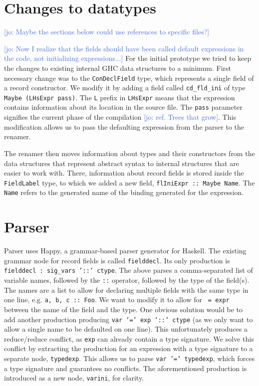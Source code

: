 \documentclass[en]{pracamgr}
\newcommand{\jcom}[1]{\textcolor{RoyalBlue}{[jo: #1]}}
\begin{document}
\section{Changes to datatypes} \jcom{Maybe the sections below could use references to specific files?}

\jcom{Now I realize that the fields should have been called default expressions in the code, not initializing expressions...}
For the initial prototype we tried to keep the changes to existing internal GHC data structures to a minimum.
First necessary change was to the \texttt{ConDeclField} type, which represents a single field of a record constructor.
We modify it by adding a field called \texttt{cd\_fld\_ini} of type \texttt{Maybe (LHsExpr pass)}. 
The \texttt{L} prefix in \texttt{LHsExpr} means that the expression contains information about its location in the source file.
The \texttt{pass} parameter signifies the current phase of the compilation \jcom{ref. Trees that grow}.
This modification allows us to pass the defaulting expression from the parser to the renamer.

The renamer then moves information about types and their constructors from the data structures that represent abstract syntax to internal structures that are easier to work with.
There, information about record fields is stored inside the \texttt{FieldLabel} type, to which we added a new field, \texttt{flIniExpr :: Maybe Name}.
The \texttt{Name} refers to the generated name of the binding generated for the expression.

\section{Parser}
Parser uses Happy, a grammar-based parser generator for Haskell.
The existing grammar node for record fields is called \texttt{fielddecl}.
Its only production is \texttt{fielddecl : sig\_vars '::' ctype}.
The above parses a comma-separated list of variable names, followed by the \texttt{::} operator, followed by the type of the field(s).
The names are a list to allow for declaring multiple fields with the same type in one line, e.g. \texttt{a, b, c :: Foo}.
We want to modify it to allow for \texttt{ = expr} between the name of the field and the type.
One obvious solution would be to add another production producing \texttt{var '=' exp '::' ctype} (as we only want to allow a single name to be defaulted on one line).
This unfortunately produces a reduce/reduce conflict, as \texttt{exp} can already contain a type signature. 
We solve this conflict by extracting the production for an expression with a type signature to a separate node, \texttt{typedexp}.
This allows us to parse \texttt{var '=' typedexp}, which forces a type signature and guarantees no conflicts.
The aforementioned production is introduced as a new node, \texttt{varini}, for clarity.
\end{document}
